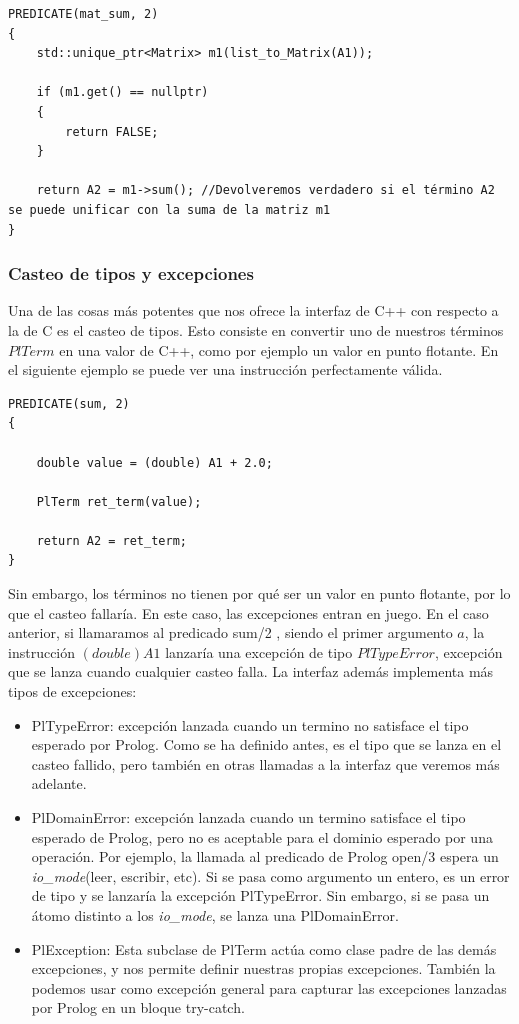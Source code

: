 \documentclass[a4paper,12pt]{article}
\begin{document}
\begin{lstlisting}[style=C++]
PREDICATE(mat_sum, 2)
{
    std::unique_ptr<Matrix> m1(list_to_Matrix(A1));
	
	if (m1.get() == nullptr)
	{
		return FALSE;
	}
	
	return A2 = m1->sum(); //Devolveremos verdadero si el término A2 se puede unificar con la suma de la matriz m1
}
\end{lstlisting}

\subsubsection{Casteo de tipos y excepciones}

Una de las cosas más potentes que nos ofrece la interfaz de C++ con respecto a la de C es el casteo de tipos. Esto consiste en convertir uno de nuestros términos $PlTerm$ en una valor de C++, como por ejemplo un valor en punto flotante. En el siguiente ejemplo se puede ver una instrucción perfectamente válida.

\begin{lstlisting}[style=C++]
PREDICATE(sum, 2)
{
	
	double value = (double) A1 + 2.0;
	
	PlTerm ret_term(value);
	
	return A2 = ret_term;
}
\end{lstlisting}

Sin embargo, los términos no tienen por qué ser un valor en punto flotante, por lo que el casteo fallaría. En este caso, las excepciones entran en juego.
En el caso anterior, si llamaramos al predicado sum/2 , siendo el primer argumento $a$, la instrucción $(double) A1$ lanzaría una excepción de tipo $PlTypeError$, excepción que se lanza cuando cualquier casteo falla. La interfaz además implementa más tipos de excepciones:

\begin{itemize}
\item PlTypeError: excepción lanzada cuando un termino no satisface el tipo esperado por Prolog. Como se ha definido antes, es el tipo que se lanza en el casteo fallido, pero también en otras llamadas a la interfaz que veremos más adelante.
\item PlDomainError: excepción lanzada cuando un termino satisface el tipo esperado de Prolog, pero no es aceptable para el dominio esperado por una operación. Por ejemplo, la llamada al predicado de Prolog open/3 espera un \textit{io\_mode}(leer, escribir, etc). Si se pasa como argumento un entero, es un error de tipo y se lanzaría la excepción PlTypeError. Sin embargo, si se pasa un átomo distinto a los \textit{io\_mode}, se lanza una PlDomainError.
\item PlException: Esta subclase de PlTerm actúa como clase padre de las demás excepciones, y nos permite definir nuestras propias excepciones. También la podemos usar como excepción general para capturar las excepciones lanzadas por Prolog en un bloque try-catch.
\end{itemize}
\end{document}
